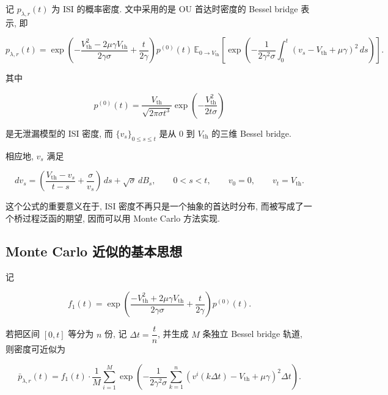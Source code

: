 \documentclass[oneside]{ctexart}
\begin{document}
记 $p_{\lambda,r}(t)$ 为 ISI 的概率密度. 文中采用的是 OU 首达时密度的 Bessel bridge 表示, 即

\begin{equation}
    p_{\lambda,r}(t)
    =
    \exp\left(
    -\dfrac{V_{\mathrm{th}}^2-2\mu\gamma V_{\mathrm{th}}}{2\gamma\sigma}
    +
    \dfrac{t}{2\gamma}
    \right)
    p^{(0)}(t)
    \,
    \mathbb{E}_{0\to V_{\mathrm{th}}}
    \left[
        \exp\left(
        -\dfrac{1}{2\gamma^2\sigma}\int_0^t (v_s-V_{\mathrm{th}}+\mu\gamma)^2\,ds
        \right)
        \right].
\end{equation}

其中

\begin{equation}
    p^{(0)}(t)
    =
    \dfrac{V_{\mathrm{th}}}{\sqrt{2\pi\sigma t^3}}
    \exp\left(
    -\dfrac{V_{\mathrm{th}}^2}{2t\sigma}
    \right)
\end{equation}

是无泄漏模型的 ISI 密度, 而 $\{v_s\}_{0\leq s\leq t}$ 是从 $0$ 到 $V_{\mathrm{th}}$ 的三维 Bessel bridge.

相应地, $v_s$ 满足

\begin{equation}
    dv_s=
    \left(
    \dfrac{V_{\mathrm{th}}-v_s}{t-s}
    +
    \dfrac{\sigma}{v_s}
    \right)\,ds
    +
    \sqrt{\sigma}\,dB_s, \qquad 0<s<t, \qquad v_0=0, \qquad v_t=V_{\mathrm{th}}.
\end{equation}

这个公式的重要意义在于, ISI 密度不再只是一个抽象的首达时分布, 而被写成了一个桥过程泛函的期望, 因而可以用 Monte Carlo 方法实现.

\subsection{Monte Carlo 近似的基本思想}

记

\begin{equation}
    f_1(t)
    =
    \exp\left(
    \dfrac{-V_{\mathrm{th}}^2+2\mu\gamma V_{\mathrm{th}}}{2\gamma\sigma}
    +
    \dfrac{t}{2\gamma}
    \right)
    p^{(0)}(t).
\end{equation}

若把区间 $[0,t]$ 等分为 $n$ 份, 记 $\Delta t=\dfrac{t}{n}$, 并生成 $M$ 条独立 Bessel bridge 轨道, 则密度可近似为

\begin{equation}
    \bar{p}_{\lambda,r}(t)
    =
    f_1(t)\cdot
    \dfrac{1}{M}
    \sum\limits_{i=1}^{M}
    \exp\left(
    -\dfrac{1}{2\gamma^2\sigma}
    \sum\limits_{k=1}^{n}
    \left(
    v^i(k\Delta t)-V_{\mathrm{th}}+\mu\gamma
    \right)^2
    \Delta t
    \right).
\end{equation}
\end{document}
